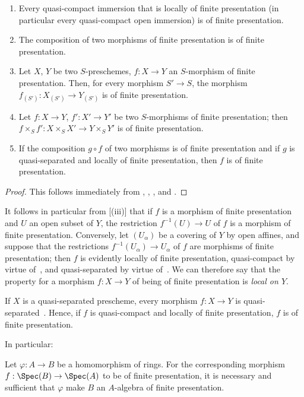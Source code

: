 \begin{proposition}[1.6.2]
\label{IV.1.6.2}
\begin{enumerate}
  \item[\rm(i)] Every quasi-compact immersion that is locally of finite presentation (in particular every quasi-compact open immersion) is of finite presentation.
  \item[\rm(ii)] The composition of two morphisms of finite presentation is of finite presentation.
  \item[\rm(iii)] Let $X$, $Y$ be two $S$-preschemes, $f:X\to Y$ an $S$-morphism of finite presentation.
  Then, for every morphism $S'\to S$, the morphism $f_{(S')}:X_{(S')}\to Y_{(S')}$ is of finite presentation.
  \item[\rm(iv)] Let $f:X\to Y$, $f':X'\to Y'$ be two $S$-morphisms of finite presentation; then $f\times_S f':X\times_S X'\to Y\times_S Y'$ is of finite presentation.
  \item[\rm(v)] If the composition $g\circ f$ of two morphisms is of finite presentation and if $g$ is quasi-separated and locally of finite presentation, then $f$ is of finite presentation.
\end{enumerate}
\end{proposition}

\begin{proof}
This follows immediately from , , , and .
\end{proof}

It follows in particular from [(iii)] that if $f$ is a morphism of finite presentation and $U$ an open subset of $Y$, the restriction $f^{-1}(U)\to U$ of $f$ is a morphism of finite presentation.
Conversely, let $(U_\alpha)$ be a covering of $Y$ by open affines, and suppose that the restrictions $f^{-1}(U_\alpha)\to U_\alpha$ of $f$ are morphisms of finite presentation; then $f$ is evidently locally of finite presentation, quasi-compact by virtue of~, and quasi-separated by virtue of~.
We can therefore say that the property for a morphism $f:X\to Y$ of being of finite presentation is \emph{local on $Y$}.

If $X$ is a quasi-separated prescheme, every morphism $f:X\to Y$ is quasi-separated~.
Hence, if $f$ is quasi-compact and locally of finite presentation, $f$ is of finite presentation.

In particular:

\begin{corollary}[1.6.3]
\label{IV.1.6.3}
Let $\varphi:A\to B$ be a homomorphism of rings.
For the corresponding morphism $f:\Spec(B)\to\Spec(A)$ to be of finite presentation, it is necessary and sufficient that $\varphi$ make $B$ an $A$-algebra of finite presentation.
\end{corollary}

